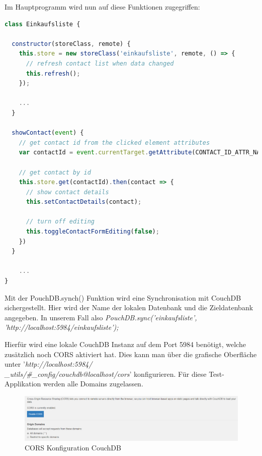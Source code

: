 Im Hauptprogramm wird nun auf diese Funktionen zugegriffen:

\begin{lstlisting}[language=JavaScript]
class Einkaufsliste {

  constructor(storeClass, remote) {
    this.store = new storeClass('einkaufsliste', remote, () => {
      // refresh contact list when data changed
      this.refresh();
    });

    ...
  }
  
  showContact(event) {
    // get contact id from the clicked element attributes
    var contactId = event.currentTarget.getAttribute(CONTACT_ID_ATTR_NAME);

    // get contact by id
    this.store.get(contactId).then(contact => {
      // show contact details
      this.setContactDetails(contact);

      // turn off editing
      this.toggleContactFormEditing(false);
    })
  }

    ...
}

\end{lstlisting}

Mit der PouchDB.synch() Funktion wird eine Synchronisation mit CouchDB sichergestellt. Hier wird der Name der lokalen Datenbank und die Zieldatenbank angegeben. In unserem Fall also \textit{PouchDB.sync('einkaufsliste', 'http://localhost:5984/einkaufsliste');}

Hierfür wird eine lokale CouchDB Instanz auf dem Port 5984 benötigt, welche zusätzlich noch CORS\cite{cors} aktiviert hat. Dies kann man über die grafische Oberfläche unter '\textit{http://localhost:5984/\\\_utils/\#\_config/couchdb@localhost/cors}' konfigurieren. Für diese Test-Applikation werden alle Domains zugelassen. 

\begin{figure}[!h]
  \begin{center}
    \includegraphics[width=1\linewidth]{images/CORS.PNG}
     \caption{CORS Konfiguration CouchDB}
    \label{broker}
  \end{center}
\end{figure}

